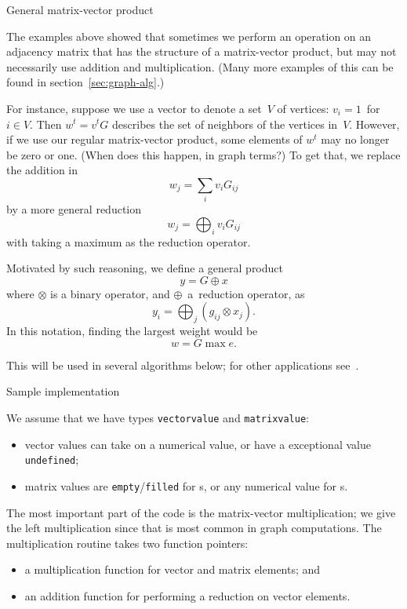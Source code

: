  {General matrix-vector product}

The examples above showed that sometimes we perform an operation
on an adjacency matrix that has the structure of a matrix-vector product,
but may not necessarily use addition and multiplication. (Many more examples 
of this can be found in section~\ref{sec:graph-alg}.)

For instance, suppose we use a vector to denote a set~$V$ of vertices:
$v_i=1$~for $i\in V$.
Then $w^t=v^tG$ describes the set of neighbors of the vertices in~$V$.
However, if we use our regular matrix-vector product,
some elements of $w^t$ may no longer be zero or one.
(When does this happen, in graph terms?)
To get that, we replace the addition in
\[ w_j = \sum_i v_i G_{ij} \]
by a more general reduction
\[ w_j = \bigoplus_i v_i G_{ij} \]
with taking a maximum as the reduction operator.

Motivated by such reasoning, we define a general product
\[ y = G \mathop{\oplus\cdot_\otimes} x \]
where $\otimes$ is a binary operator, and $\oplus$~a~reduction operator,
as
\[ y_i = \bigoplus_j (g_{ij} \otimes x_j ). \]
In this notation, finding the largest weight would be
\[ w= G\mathop{\max\cdot_\times} e. \]

This will be used in several algorithms below;
for other applications see~\cite{Kung:pegasus2009}.

 {Sample implementation}

We assume that we have types \lstinline{vectorvalue} and \lstinline{matrixvalue}:
\begin{itemize}
\item
  vector values can take on a numerical value, or have a exceptional
  value \lstinline{undefined};
\item matrix values are \lstinline{empty}/\lstinline{filled}
  for s,
  or any numerical value for s.
\end{itemize}

The most important part of the code is the matrix-vector multiplication;
we give the left multiplication since that is most common in graph computations.
%
%
The multiplication routine takes two function pointers:
\begin{itemize}
\item a multiplication function for vector and matrix elements; and
\item an addition function for performing a reduction on vector elements.
\end{itemize}

